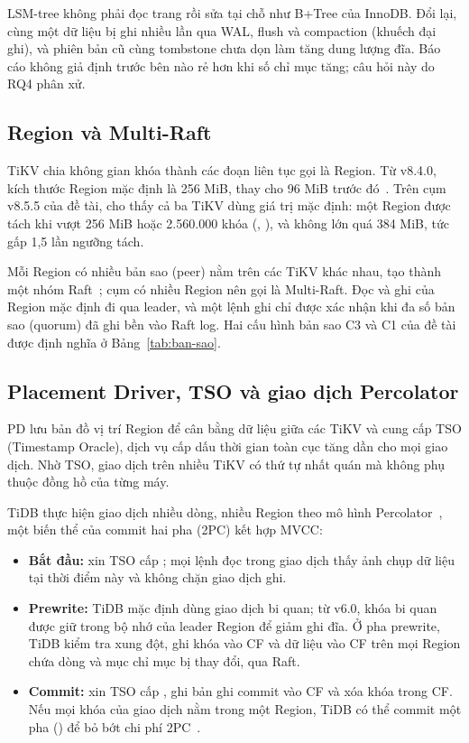 LSM-tree không phải đọc trang rồi sửa tại chỗ như B+Tree của InnoDB. Đổi lại, cùng một dữ liệu bị ghi nhiều lần qua WAL, flush và compaction (khuếch đại ghi), và phiên bản cũ cùng tombstone chưa dọn làm tăng dung lượng đĩa. Báo cáo không giả định trước bên nào rẻ hơn khi số chỉ mục tăng; câu hỏi này do RQ4 phân xử.

\subsection{Region và Multi-Raft}
TiKV chia không gian khóa thành các đoạn liên tục \code{[StartKey, EndKey)} gọi là Region. Từ v8.4.0, kích thước Region mặc định là 256 MiB, thay cho 96 MiB trước đó~\cite{tidb_region_size}. Trên cụm v8.5.5 của đề tài,  cho thấy cả ba TiKV dùng giá trị mặc định: một Region được tách khi vượt 256 MiB hoặc 2.560.000 khóa (, ), và không lớn quá 384 MiB, tức gấp 1,5 lần ngưỡng tách.

Mỗi Region có nhiều bản sao (peer) nằm trên các TiKV khác nhau, tạo thành một nhóm Raft~\cite{raft}; cụm có nhiều Region nên gọi là Multi-Raft. Đọc và ghi của Region mặc định đi qua leader, và một lệnh ghi chỉ được xác nhận khi đa số bản sao (quorum) đã ghi bền vào Raft log. Hai cấu hình bản sao C3 và C1 của đề tài được định nghĩa ở Bảng~\ref{tab:ban-sao}.

\subsection{Placement Driver, TSO và giao dịch Percolator}
PD lưu bản đồ vị trí Region để cân bằng dữ liệu giữa các TiKV và cung cấp TSO (Timestamp Oracle), dịch vụ cấp dấu thời gian toàn cục tăng dần cho mọi giao dịch. Nhờ TSO, giao dịch trên nhiều TiKV có thứ tự nhất quán mà không phụ thuộc đồng hồ của từng máy.

TiDB thực hiện giao dịch nhiều dòng, nhiều Region theo mô hình Percolator~\cite{percolator}, một biến thể của commit hai pha (2PC) kết hợp MVCC:
\begin{itemize}
  \item \textbf{Bắt đầu:} xin TSO cấp ; mọi lệnh đọc trong giao dịch thấy ảnh chụp dữ liệu tại thời điểm này và không chặn giao dịch ghi.
  \item \textbf{Prewrite:} TiDB mặc định dùng giao dịch bi quan; từ v6.0, khóa bi quan được giữ trong bộ nhớ của leader Region để giảm ghi đĩa. Ở pha prewrite, TiDB kiểm tra xung đột, ghi khóa vào  CF và dữ liệu vào  CF trên mọi Region chứa dòng và mục chỉ mục bị thay đổi, qua Raft.
  \item \textbf{Commit:} xin TSO cấp , ghi bản ghi commit vào  CF và xóa khóa trong  CF. Nếu mọi khóa của giao dịch nằm trong một Region, TiDB có thể commit một pha () để bỏ bớt chi phí 2PC~\cite{tidb_sysvars}.
\end{itemize}

